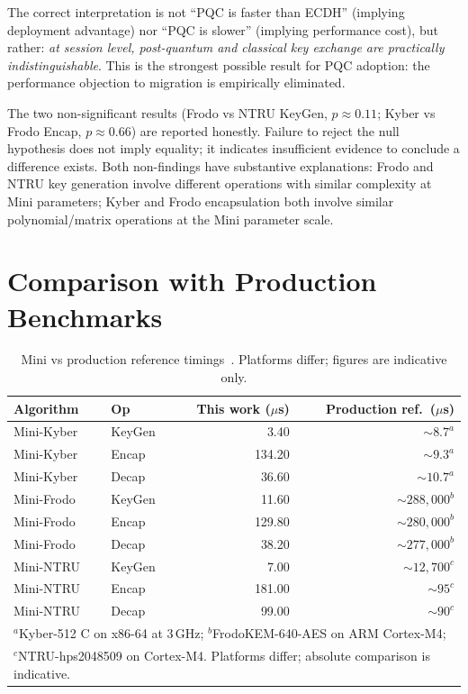 \documentclass[12pt,a4paper]{report}
\begin{document}
The correct interpretation is not ``PQC is faster than ECDH'' (implying deployment
advantage) nor ``PQC is slower'' (implying performance cost), but rather: \emph{at
session level, post-quantum and classical key exchange are practically
indistinguishable}. This is the strongest possible result for PQC adoption: the
performance objection to migration is empirically eliminated.

The two non-significant results (Frodo vs NTRU KeyGen, $p \approx 0.11$; Kyber vs
Frodo Encap, $p \approx 0.66$) are reported honestly. Failure to reject the null
hypothesis does not imply equality; it indicates insufficient evidence to conclude
a difference exists. Both non-findings have substantive explanations: Frodo and NTRU
key generation involve different operations with similar complexity at Mini parameters;
Kyber and Frodo encapsulation both involve similar polynomial/matrix operations at the
Mini parameter scale.

\section{Comparison with Production Benchmarks}

\begin{table}[H]
\centering
\caption{Mini vs production reference timings~\cite{pqm4,crystals_kyber_spec}.
Platforms differ; figures are indicative only.}
\label{tab:comparison}
\begin{tabular}{l|l|r|r}
\toprule
\textbf{Algorithm} & \textbf{Op} & \textbf{This work ($\mu$s)} & \textbf{Production ref.\ ($\mu$s)} \\
\midrule
Mini-Kyber & KeyGen & 3.40 & $\sim 8.7^a$ \\
Mini-Kyber & Encap & 134.20 & $\sim 9.3^a$ \\
Mini-Kyber & Decap & 36.60 & $\sim 10.7^a$ \\
\midrule
Mini-Frodo & KeyGen & 11.60 & $\sim 288{,}000^b$ \\
Mini-Frodo & Encap & 129.80 & $\sim 280{,}000^b$ \\
Mini-Frodo & Decap & 38.20 & $\sim 277{,}000^b$ \\
\midrule
Mini-NTRU & KeyGen & 7.00 & $\sim 12{,}700^c$ \\
Mini-NTRU & Encap & 181.00 & $\sim 95^c$ \\
Mini-NTRU & Decap & 99.00 & $\sim 90^c$ \\
\bottomrule
\multicolumn{4}{l}{\small $^a$Kyber-512 C on x86-64 at 3\,GHz; $^b$FrodoKEM-640-AES on ARM Cortex-M4;}\\
\multicolumn{4}{l}{\small $^c$NTRU-hps2048509 on Cortex-M4. Platforms differ; absolute comparison is indicative.}
\end{tabular}
\end{table}
\end{document}
